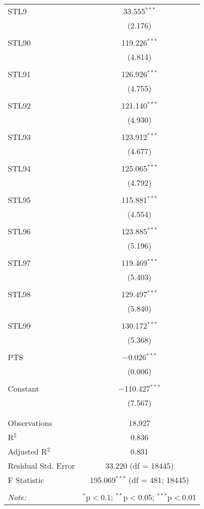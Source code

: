 \begin{table}[!htbp]
\begin{tabular}{@{\extracolsep{5pt}}lc}
 STL9 & 33.555$^{***}$ \\ 
  & (2.176) \\ 
  & \\ 
 STL90 & 119.226$^{***}$ \\ 
  & (4.814) \\ 
  & \\ 
 STL91 & 126.926$^{***}$ \\ 
  & (4.755) \\ 
  & \\ 
 STL92 & 121.140$^{***}$ \\ 
  & (4.930) \\ 
  & \\ 
 STL93 & 123.912$^{***}$ \\ 
  & (4.677) \\ 
  & \\ 
 STL94 & 125.065$^{***}$ \\ 
  & (4.792) \\ 
  & \\ 
 STL95 & 115.881$^{***}$ \\ 
  & (4.554) \\ 
  & \\ 
 STL96 & 123.885$^{***}$ \\ 
  & (5.196) \\ 
  & \\ 
 STL97 & 119.469$^{***}$ \\ 
  & (5.403) \\ 
  & \\ 
 STL98 & 129.497$^{***}$ \\ 
  & (5.840) \\ 
  & \\ 
 STL99 & 130.172$^{***}$ \\ 
  & (5.368) \\ 
  & \\ 
 PTS & $-$0.026$^{***}$ \\ 
  & (0.006) \\ 
  & \\ 
 Constant & $-$110.427$^{***}$ \\ 
  & (7.567) \\ 
  & \\ 
\hline \\[-1.8ex] 
Observations & 18,927 \\ 
R$^{2}$ & 0.836 \\ 
Adjusted R$^{2}$ & 0.831 \\ 
Residual Std. Error & 33.220 (df = 18445) \\ 
F Statistic & 195.069$^{***}$ (df = 481; 18445) \\ 
\hline 
\hline \\[-1.8ex] 
\textit{Note:}  & \multicolumn{1}{r}{$^{*}$p$<$0.1; $^{**}$p$<$0.05; $^{***}$p$<$0.01} \\ 
\end{tabular} 
\end{table} 
